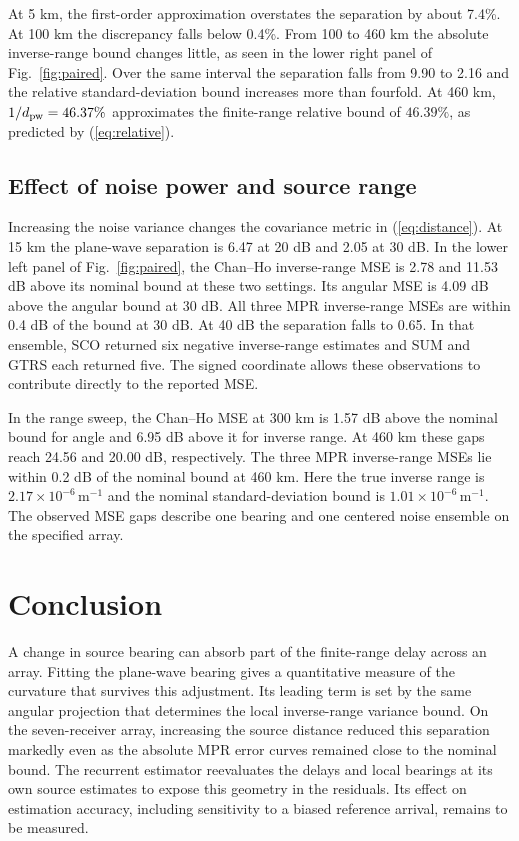 \documentclass[journal]{IEEEtran}
\begin{document}
At 5 km, the first-order approximation overstates the separation by about 7.4\%. At 100 km the discrepancy falls below 0.4\%. From 100 to 460 km the absolute inverse-range bound changes little, as seen in the lower right panel of Fig.~\ref{fig:paired}. Over the same interval the separation falls from 9.90 to 2.16 and the relative standard-deviation bound increases more than fourfold. At 460 km, \(1/d_{\rm pw}=46.37\%\) approximates the finite-range relative bound of \(46.39\%\), as predicted by (\ref{eq:relative}).

\subsection{Effect of noise power and source range}
Increasing the noise variance changes the covariance metric in (\ref{eq:distance}). At 15 km the plane-wave separation is 6.47 at 20 dB and 2.05 at 30 dB. In the lower left panel of Fig.~\ref{fig:paired}, the Chan--Ho inverse-range MSE is 2.78 and 11.53 dB above its nominal bound at these two settings. Its angular MSE is 4.09 dB above the angular bound at 30 dB. All three MPR inverse-range MSEs are within 0.4 dB of the bound at 30 dB. At 40 dB the separation falls to 0.65. In that ensemble, SCO returned six negative inverse-range estimates and SUM and GTRS each returned five. The signed coordinate allows these observations to contribute directly to the reported MSE.

In the range sweep, the Chan--Ho MSE at 300 km is 1.57 dB above the nominal bound for angle and 6.95 dB above it for inverse range. At 460 km these gaps reach 24.56 and 20.00 dB, respectively. The three MPR inverse-range MSEs lie within 0.2 dB of the nominal bound at 460 km. Here the true inverse range is \(2.17\times10^{-6}\,\mathrm{m}^{-1}\) and the nominal standard-deviation bound is \(1.01\times10^{-6}\,\mathrm{m}^{-1}\). The observed MSE gaps describe one bearing and one centered noise ensemble on the specified array.

\section{Conclusion}
A change in source bearing can absorb part of the finite-range delay across an array. Fitting the plane-wave bearing gives a quantitative measure of the curvature that survives this adjustment. Its leading term is set by the same angular projection that determines the local inverse-range variance bound. On the seven-receiver array, increasing the source distance reduced this separation markedly even as the absolute MPR error curves remained close to the nominal bound. The recurrent estimator reevaluates the delays and local bearings at its own source estimates to expose this geometry in the residuals. Its effect on estimation accuracy, including sensitivity to a biased reference arrival, remains to be measured.

\balance


\end{document}
